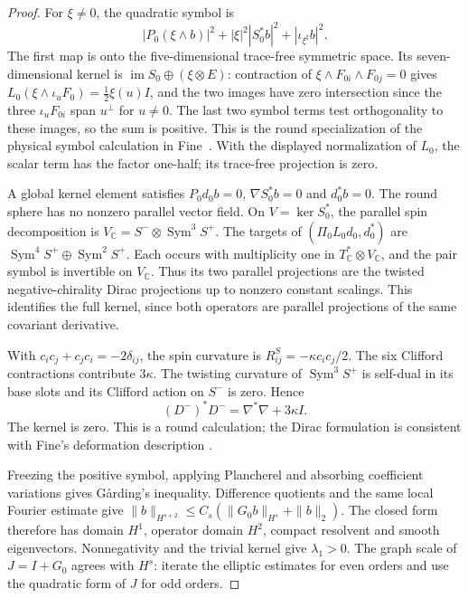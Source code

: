 \documentclass[11pt]{article}
\numberwithin{equation}{section}
\theoremstyle{definition}
\theoremstyle{remark}
\begin{document}
\begin{proof}
For $\xi\ne0$, the quadratic symbol is
\[
 |P_0(\xi\wedge b)|^2+|\xi|^2|S_0^*b|^2
                              +|\iota_{\xi^\sharp}b|^2.
\]
The first map is onto the five-dimensional trace-free
symmetric space. Its seven-dimensional kernel is
$\operatorname{im}S_0\oplus(\xi\otimes E)$: contraction of
$\xi\wedge F_{0i}\wedge F_{0j}=0$ gives
$L_0(\xi\wedge\iota_uF_0)=\tfrac12\xi(u)I$, and
the two images have zero intersection since the three
$\iota_uF_{0i}$ span $u^\perp$ for $u\ne0$.
The last two symbol terms test orthogonality to these images,
so the sum is positive.
This is the round specialization of the physical symbol
calculation in Fine~\cite[Lemmas 4.6 and 4.9]{Fine2011}.
With the displayed normalization of $L_0$, the scalar term
has the factor one-half; its trace-free projection is zero.

A global kernel element satisfies
$P_0d_0b=0$, $\nabla S_0^*b=0$ and $d_0^*b=0$.
The round sphere has no nonzero parallel vector field.
On $V=\ker S_0^*$, the parallel spin decomposition is
$V_{\mathbb C}=S^-\otimes\operatorname{Sym}^3S^+$.
The targets of $(\Pi_0L_0d_0,d_0^*)$ are
$\operatorname{Sym}^4S^+\oplus\operatorname{Sym}^2S^+$.
Each occurs with multiplicity one in
$T^*_{\mathbb C}\otimes V_{\mathbb C}$, and the pair symbol
is invertible on $V_{\mathbb C}$. Thus its two parallel
projections are the twisted negative-chirality Dirac
projections up to nonzero constant scalings. This identifies
the full kernel, since both operators are parallel projections
of the same covariant derivative.

With $c_ic_j+c_jc_i=-2\delta_{ij}$, the spin curvature is
$R^S_{ij}=-\kappa c_ic_j/2$. The six Clifford contractions
contribute $3\kappa$. The twisting curvature of
$\operatorname{Sym}^3S^+$ is self-dual in its base slots
and its Clifford action on $S^-$ is zero. Hence
\[
 (D^-)^*D^-=\nabla^*\nabla+3\kappa I .
\]
The kernel is zero. This is a round calculation; the
Dirac formulation is consistent with Fine's deformation
description \cite[Section 3.4]{Fine2011}.

Freezing the positive symbol, applying Plancherel and
absorbing coefficient variations gives G{\aa}rding's
inequality. Difference quotients and the same local
Fourier estimate give
$\|b\|_{H^{s+2}}\le C_s(\|G_0b\|_{H^s}+\|b\|_2)$.
The closed form therefore has domain $H^1$, operator domain
$H^2$, compact resolvent and smooth eigenvectors.
Nonnegativity and the trivial kernel give $\lambda_1>0$.
The graph scale of $J=I+G_0$ agrees with $H^s$:
iterate the elliptic estimates for even orders and use
the quadratic form of $J$ for odd orders.


\end{proof}
\end{document}
